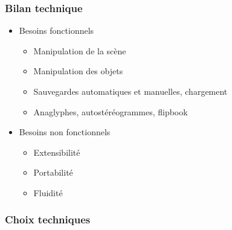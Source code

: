 \documentclass{beamer}
\begin{document}
\begin{frame}
\frametitle{Bilan technique}
\begin{itemize}[label=$\bullet$]
\item Besoins fonctionnels
	\begin{itemize}[label=$\checkmark$]
	\item Manipulation de la scène
	\item Manipulation des objets
	\item Sauvegardes automatiques et manuelles, chargement
	\item Anaglyphes, autostéréogrammes, flipbook
	\end{itemize}
\item Besoins non fonctionnels
	\begin{itemize}[label=$\checkmark$]
	\item Extensibilité
	\item Portabilité  
	\item Fluidité %
	\end{itemize}
\end{itemize}
\end{frame}


\begin{frame}
\frametitle{Choix techniques}

\end{frame}
\end{document}
